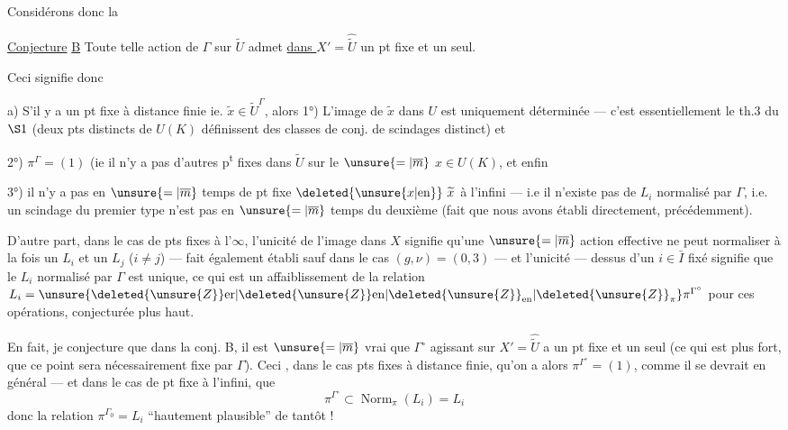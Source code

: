 Considérons donc la

\uline{Conjecture} \uline{B} Toute telle action de $\Gamma$ sur $\widetilde U$ admet \uline{dans $X'$}$=\widehat{\widetilde U}$ un pt fixe et un seul.

Ceci signifie donc

a) S'il y a un pt fixe à distance finie ie. $\widetilde x\in\widetilde U^\Gamma$, alors 1°) L'image de $\widetilde x$ dans $U$ est uniquement déterminée --- c'est essentiellement le th.3 du $\S1$ (deux pts distincts de $U(K)$ définissent des classes de conj. de scindages distinct) et

2°) $\pi^\Gamma=(1)$ (ie il n'y a pas d'autres
p\textsuperscript{t} fixes dans $\widetilde U$ sur le $\unsure{=|\overline m}$ $x\in U(K)$,
et enfin

3°) il n'y a pas en $\unsure{=|\overline m}$ temps de pt
fixe $\deleted{\unsure{x|\mathrm{en}}}\ \widetilde x$ à l'infini --- i.e il n'existe
pas de $L_i$ normalisé par $\Gamma$, i.e. un scindage
du premier type n'est pas en $\unsure{=|\overline m}$ temps
du deuxième (fait que nous avons
établi directement, précédemment).


D'autre part, dans le cas de pts fixes
à l'$\infty$, l'unicité de l'image dans $X$
signifie qu'une $\unsure{=|\overline m}$ action effective ne
peut normaliser à la fois un $L_i$ et un $L_j$
($i\ne j$) --- fait également établi sauf
dans le cas $(g,\nu)=(0,3)$ --- et l'unicité
--- dessus d'un $i\in\bar I$ fixé signifie
que le $L_i$  normalisé par $\Gamma$ est unique,
ce qui est un affaiblissement de la
relation $L_i=\unsure{\deleted{\unsure{Z}}\mathrm{er}|\deleted{\unsure{Z}}\mathrm{en}|\deleted{\unsure{Z}}_{\mathrm{en}}|\deleted{\unsure{Z}}_{\pi}}\pi^{\Gamma^\circ}$
pour ces opérations, conjecturée plus haut.

En fait, je conjecture que dans la conj. B, il est $\unsure{=|\overline m}$ vrai que $\Gamma^\circ$ agissant sur $X'=\widehat{\widetilde U}$ a un pt fixe et un seul (ce qui est plus fort, que ce point  sera nécessairement fixe par $\Gamma$). Ceci , dans le cas  pts fixes à distance finie, qu'on a alors $\pi^{\Gamma^\circ}=(1)$, comme il se devrait en général --- et dans le cas de pt fixe à l'infini, que
\[
\pi^{\Gamma^\circ}\subset\operatorname{Norm}_{\pi}(L_i)=L_i
\]
donc la relation $\pi^{\Gamma_0}=L_i$ ``hautement plausible'' de tantôt !

